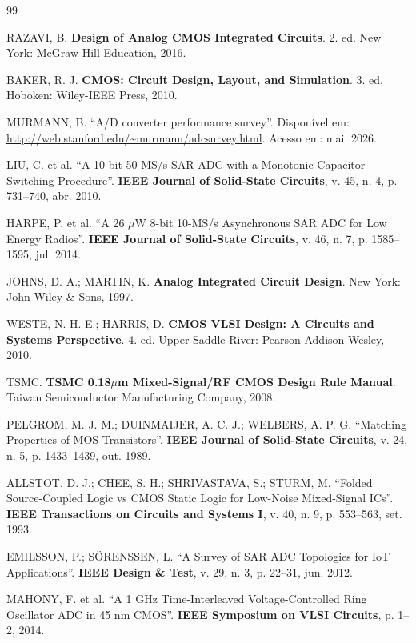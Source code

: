 \documentclass[12pt,a4paper]{article}
\begin{document}
\begin{thebibliography}{99}

RAZAVI, B.
\textbf{Design of Analog CMOS Integrated Circuits}.
2. ed. New York: McGraw-Hill Education, 2016.

BAKER, R. J.
\textbf{CMOS: Circuit Design, Layout, and Simulation}.
3. ed. Hoboken: Wiley-IEEE Press, 2010.

MURMANN, B.
``A/D converter performance survey''.
Disponível em: \url{http://web.stanford.edu/~murmann/adcsurvey.html}.
Acesso em: mai. 2026.

LIU, C. et al.
``A 10-bit 50-MS/s SAR ADC with a Monotonic Capacitor Switching Procedure''.
\textbf{IEEE Journal of Solid-State Circuits}, v. 45, n. 4,
p. 731--740, abr. 2010.

HARPE, P. et al.
``A 26 $\mu$W 8-bit 10-MS/s Asynchronous SAR ADC for Low Energy Radios''.
\textbf{IEEE Journal of Solid-State Circuits}, v. 46, n. 7,
p. 1585--1595, jul. 2014.

JOHNS, D. A.; MARTIN, K.
\textbf{Analog Integrated Circuit Design}.
New York: John Wiley \& Sons, 1997.

WESTE, N. H. E.; HARRIS, D.
\textbf{CMOS VLSI Design: A Circuits and Systems Perspective}.
4. ed. Upper Saddle River: Pearson Addison-Wesley, 2010.

TSMC.
\textbf{TSMC 0.18$\mu$m Mixed-Signal/RF CMOS Design Rule Manual}.
Taiwan Semiconductor Manufacturing Company, 2008.

PELGROM, M. J. M.; DUINMAIJER, A. C. J.; WELBERS, A. P. G.
``Matching Properties of MOS Transistors''.
\textbf{IEEE Journal of Solid-State Circuits}, v. 24, n. 5,
p. 1433--1439, out. 1989.

ALLSTOT, D. J.; CHEE, S. H.; SHRIVASTAVA, S.; STURM, M.
``Folded Source-Coupled Logic vs CMOS Static Logic for Low-Noise
Mixed-Signal ICs''.
\textbf{IEEE Transactions on Circuits and Systems I}, v. 40, n. 9,
p. 553--563, set. 1993.

EMILSSON, P.; SÖRENSSEN, L.
``A Survey of SAR ADC Topologies for IoT Applications''.
\textbf{IEEE Design \& Test}, v. 29, n. 3, p. 22--31, jun. 2012.

MAHONY, F. et al.
``A 1 GHz Time-Interleaved Voltage-Controlled Ring Oscillator ADC in 45 nm CMOS''.
\textbf{IEEE Symposium on VLSI Circuits}, p. 1--2, 2014.

\end{thebibliography}
\end{document}
